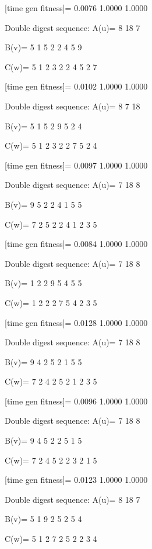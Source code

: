 [time gen fitness]=
    0.0076    1.0000    1.0000

Double digest sequence:
A(u)=
     8    18     7

B(v)=
     5     1     5     2     2     4     5     9

C(w)=
     5     1     2     3     2     2     4     5     2     7

[time gen fitness]=
    0.0102    1.0000    1.0000

Double digest sequence:
A(u)=
     8     7    18

B(v)=
     5     1     5     2     9     5     2     4

C(w)=
     5     1     2     3     2     2     7     5     2     4

[time gen fitness]=
    0.0097    1.0000    1.0000

Double digest sequence:
A(u)=
     7    18     8

B(v)=
     9     5     2     2     4     1     5     5

C(w)=
     7     2     5     2     2     4     1     2     3     5

[time gen fitness]=
    0.0084    1.0000    1.0000

Double digest sequence:
A(u)=
     7    18     8

B(v)=
     1     2     2     9     5     4     5     5

C(w)=
     1     2     2     2     7     5     4     2     3     5

[time gen fitness]=
    0.0128    1.0000    1.0000

Double digest sequence:
A(u)=
     7    18     8

B(v)=
     9     4     2     5     2     1     5     5

C(w)=
     7     2     4     2     5     2     1     2     3     5

[time gen fitness]=
    0.0096    1.0000    1.0000

Double digest sequence:
A(u)=
     7    18     8

B(v)=
     9     4     5     2     2     5     1     5

C(w)=
     7     2     4     5     2     2     3     2     1     5

[time gen fitness]=
    0.0123    1.0000    1.0000

Double digest sequence:
A(u)=
     8    18     7

B(v)=
     5     1     9     2     5     2     5     4

C(w)=
     5     1     2     7     2     5     2     2     3     4

